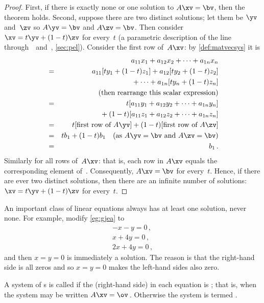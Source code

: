 \begin{proof} 
First, if there is exactly none or one solution to \(A\xv=\bv\), then the theorem holds. 
Second, suppose there are two distinct solutions; let them be \(\yv\) and~\(\zv\) so \(A\yv=\bv\) and \(A\zv=\bv\).  
Then consider \(\xv=t\yv+(1-t)\zv\) for every~\(t\) (a parametric description of the line through~\yv\ and~\zv, \cref{sec:pel}). 
Consider the first row of~\(A\xv\): by \cref{def:matvecsys} it is
\begin{eqnarray*}&&
a_{11}x_1+a_{12}x_2+\cdots+a_{1n}x_n
\\&=&a_{11}[ty_1+(1-t)z_1]+a_{12}[ty_2+(1-t)z_2]
\\&&{}
+\cdots+a_{1n}[ty_n+(1-t)z_n]
\\&&\quad(\text{then rearrange this scalar expression})
\\&=&t[a_{11}y_1+a_{12}y_2+\cdots+a_{1n}y_n]
\\&&{}
+(1-t)[a_{11}z_1+a_{12}z_2+\cdots+a_{1n}z_n]
\\&=&t[\text{first row of }A\yv]
+(1-t)[\text{first row of }A\zv]
\\&=&tb_1+(1-t)b_1 \quad(\text{as }A\yv=\bv\text{ and }A\zv=\bv)
\\&=&b_1\,.
\end{eqnarray*}
Similarly for all rows of~\(A\xv\): that is, each row in \(A\xv\) equals the corresponding element of~\bv.
Consequently, \(A\xv=\bv\) for every~\(t\). 
Hence, if there are ever two distinct solutions, then there are an infinite number of solutions: \(\xv=t\yv+(1-t)\zv\) for every~\(t\).
\end{proof}




An important class of linear equations always has at least one solution, never none.
For example, modify \cref{eg:gjea} to 
\begin{equation*}
\begin{array}{l}
-x-y=0\,,\\x+4y=0\,,\\2x+4y=0\,,
\end{array}
\end{equation*}
and then \(x=y=0\) is immediately a solution.  
The reason is that the right-hand side is all zeros and so \(x=y=0\) makes the left-hand sides also zero.

\begin{definition} \label{def:homosys} 
A system of s is called  if the (right-hand side)  in each equation is ; that is, when the system may be written \(A\xv=\ov\)\,.
Otherwise the system is termed .
\end{definition}

